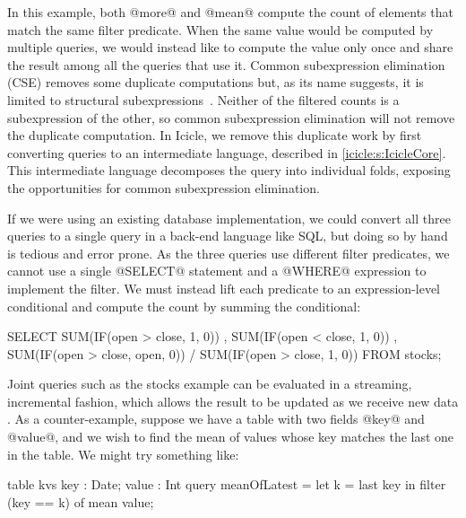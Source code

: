 In this example, both @more@ and @mean@ compute the count of elements that match the same filter predicate.
When the same value would be computed by multiple queries, we would instead like to compute the value only once and share the result among all the queries that use it.
Common subexpression elimination (CSE) removes some duplicate computations but, as its name suggests, it is limited to structural subexpressions~\cite{chitil1997uncommon}.
Neither of the filtered counts is a subexpression of the other, so common subexpression elimination will not remove the duplicate computation.
In Icicle, we remove this duplicate work by first converting queries to an intermediate language, described in \cref{icicle:s:IcicleCore}.
This intermediate language decomposes the query into individual folds, exposing the opportunities for common subexpression elimination.

If we were using an existing database implementation, we could convert all three queries to a single query in a back-end language like SQL, but doing so by hand is tedious and error prone.
As the three queries use different filter predicates, we cannot use a single @SELECT@ statement and a @WHERE@ expression to implement the filter.
We must instead lift each predicate to an expression-level conditional and compute the count by summing the conditional:

\begin{sql}
  SELECT SUM(IF(open > close, 1,    0))
       , SUM(IF(open < close, 1,    0))
       , SUM(IF(open > close, open, 0))
       / SUM(IF(open > close, 1,    0))
  FROM stocks;
\end{sql}


Joint queries such as the stocks example can be evaluated in a streaming, incremental fashion, which allows the result to be updated as we receive new data \citep{arasu2003cql}.
As a counter-example, suppose we have a table with two fields @key@ and @value@, and we wish to find the mean of values whose key matches the last one in the table.
We might try something like:

\begin{icicle}
  table kvs { key : Date; value : Int }
  query meanOfLatest
   = let k = last key in
     filter (key == k) of mean value;
\end{icicle}

